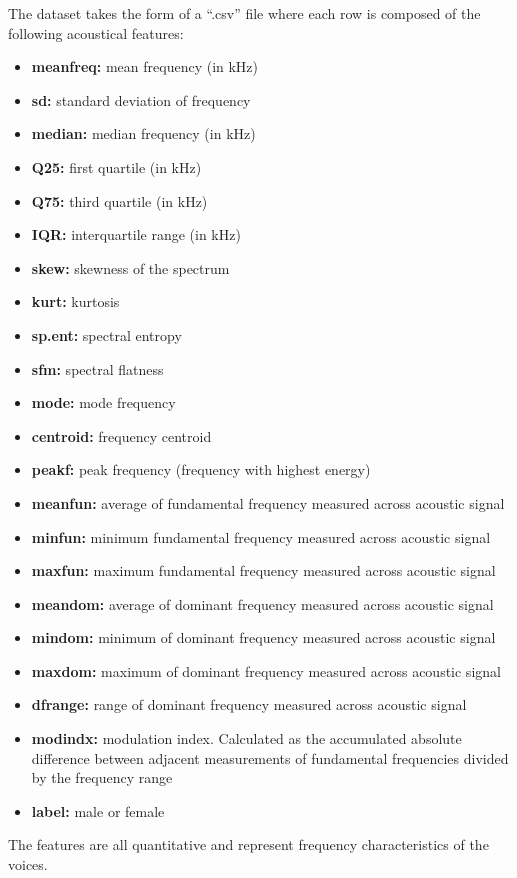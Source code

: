 The dataset takes the form of a ``.csv'' file where each row is composed of the following acoustical features:
\begin{itemize}
	\item \textbf{meanfreq:} mean frequency (in kHz)
	\item \textbf{sd:} standard deviation of frequency
	\item \textbf{median:} median frequency (in kHz)
	\item \textbf{Q25:} first quartile (in kHz)
	\item \textbf{Q75:} third quartile (in kHz)
	\item \textbf{IQR:} interquartile range (in kHz)
	\item \textbf{skew:} skewness of the spectrum
	\item \textbf{kurt:} kurtosis
	\item \textbf{sp.ent:} spectral entropy
	\item \textbf{sfm:} spectral flatness
	\item \textbf{mode:} mode frequency
	\item \textbf{centroid:} frequency centroid 
	\item \textbf{peakf:} peak frequency (frequency with highest energy)
	\item \textbf{meanfun:} average of fundamental frequency measured across acoustic signal
	\item \textbf{minfun:} minimum fundamental frequency measured across acoustic signal
	\item \textbf{maxfun:} maximum fundamental frequency measured across acoustic signal
	\item \textbf{meandom:} average of dominant frequency measured across acoustic signal
	\item \textbf{mindom:} minimum of dominant frequency measured across acoustic signal
	\item \textbf{maxdom:} maximum of dominant frequency measured across acoustic signal
	\item \textbf{dfrange:} range of dominant frequency measured across acoustic signal
	\item \textbf{modindx:} modulation index. Calculated as the accumulated absolute difference between adjacent measurements of fundamental frequencies divided by the frequency range
	\item \textbf{label:} male or female
\end{itemize}

The features are all quantitative and represent frequency characteristics of the voices.
